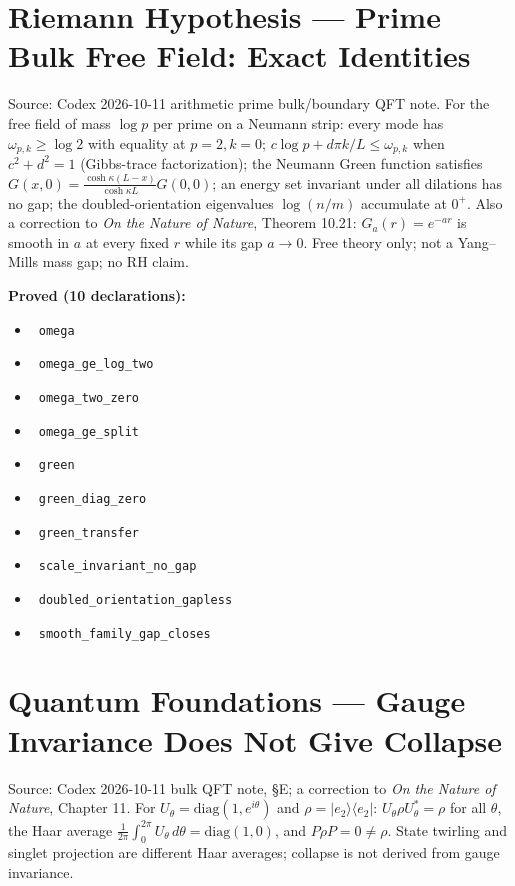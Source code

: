 \documentclass{report}
\theoremstyle{definition}
\begin{document}
\section{Riemann Hypothesis --- Prime Bulk Free Field: Exact Identities}
Source: Codex 2026-10-11 arithmetic prime bulk/boundary QFT note. For the free field of mass $\log p$ per prime on a Neumann strip: every mode has $\omega_{p,k}\ge\log2$ with equality at $p=2,k=0$; $c\log p+d\pi k/L\le\omega_{p,k}$ when $c^2+d^2=1$ (Gibbs-trace factorization); the Neumann Green function satisfies $G(x,0)=\frac{\cosh\kappa(L-x)}{\cosh\kappa L}G(0,0)$; an energy set invariant under all dilations has no gap; the doubled-orientation eigenvalues $\log(n/m)$ accumulate at $0^+$. Also a correction to \emph{On the Nature of Nature}, Theorem 10.21: $G_a(r)=e^{-ar}$ is smooth in $a$ at every fixed $r$ while its gap $a\to0$. Free theory only; not a Yang--Mills mass gap; no RH claim.

\noindent\textbf{Proved (10 declarations):}
\begin{itemize}
  \item {}\leanok\ \texttt{omega}
  \item {}\leanok\ \texttt{omega\_ge\_log\_two}
  \item {}\leanok\ \texttt{omega\_two\_zero}
  \item {}\leanok\ \texttt{omega\_ge\_split}
  \item {}\leanok\ \texttt{green}
  \item {}\leanok\ \texttt{green\_diag\_zero}
  \item {}\leanok\ \texttt{green\_transfer}
  \item {}\leanok\ \texttt{scale\_invariant\_no\_gap}
  \item {}\leanok\ \texttt{doubled\_orientation\_gapless}
  \item {}\leanok\ \texttt{smooth\_family\_gap\_closes}
\end{itemize}

\section{Quantum Foundations --- Gauge Invariance Does Not Give Collapse}
Source: Codex 2026-10-11 bulk QFT note, \S E; a correction to \emph{On the Nature of Nature}, Chapter 11. For $U_\theta=\mathrm{diag}(1,e^{i\theta})$ and $\rho=|e_2\rangle\langle e_2|$: $U_\theta\rho U_\theta^*=\rho$ for all $\theta$, the Haar average $\frac1{2\pi}\int_0^{2\pi}U_\theta\,d\theta=\mathrm{diag}(1,0)$, and $P\rho P=0\ne\rho$. State twirling and singlet projection are different Haar averages; collapse is not derived from gauge invariance.
\end{document}
